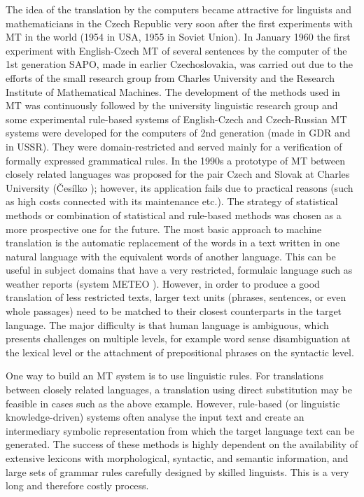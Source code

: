 \begin{multicols}{2}
The idea of the translation by the computers became attractive for linguists and mathematicians in the Czech Republic very soon after the first experiments with MT in the world (1954 in USA, 1955 in Soviet Union). In January 1960 the first experiment with English-Czech MT of several sentences by the computer of the 1st generation SAPO, made in earlier Czechoslovakia, was carried out due to the efforts of the small research group from Charles University and the Research Institute of Mathematical Machines. The development of the methods used in MT was continuously followed by the university linguistic research group and some experimental rule-based systems of English-Czech and Czech-Russian MT systems were developed for the computers of 2nd generation (made in GDR and in USSR). They were domain-restricted and served mainly for a verification of formally expressed grammatical rules. In the 1990s a prototype of MT between closely related languages was proposed for the pair Czech and Slovak at Charles University (Česílko \cite{Note18}); however, its application fails due to practical reasons (such as high costs connected with its maintenance etc.). The strategy of statistical methods or combination of statistical and rule-based methods was chosen as a more prospective one for the future.
The most basic approach to machine translation is the automatic replacement of the words in a text written in one natural language with the equivalent words of another language. This can be useful in subject domains that have a very restricted, formulaic language such as weather reports (system METEO \cite{Note19}). However, in order to produce a good translation of less restricted texts, larger text units (phrases, sentences, or even whole passages) need to be matched to their closest counterparts in the target language. The major difficulty is that human language is ambiguous, which presents challenges on multiple levels, for example word sense disambiguation at the lexical level or the attachment of prepositional phrases on the syntactic level.

One way to build an MT system is to use linguistic rules. For translations between closely related languages, a translation using direct substitution may be feasible in cases such as the above example. However, rule-based (or linguistic knowledge-driven) systems often analyse the input text and create an intermediary symbolic representation from which the target language text can be generated. The success of these methods is highly dependent on the availability of extensive lexicons with morphological, syntactic, and semantic information, and large sets of grammar rules carefully designed by skilled linguists. This is a very long and therefore costly process.


\end{multicols}
